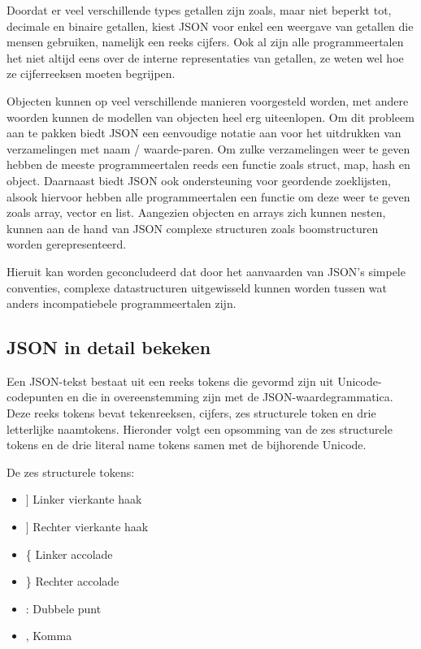 Doordat er veel verschillende types getallen zijn zoals, maar niet beperkt tot, decimale en binaire getallen, kiest JSON voor enkel een weergave van getallen die mensen gebruiken, namelijk een reeks cijfers. Ook al zijn alle programmeertalen het niet altijd eens over de interne representaties van getallen, ze weten wel hoe ze cijferreeksen moeten begrijpen.

 Objecten kunnen op veel verschillende manieren voorgesteld worden, met andere woorden kunnen de modellen van objecten heel erg uiteenlopen. Om dit probleem aan te pakken biedt JSON een eenvoudige notatie aan voor het uitdrukken van verzamelingen met naam / waarde-paren. Om zulke verzamelingen weer te geven hebben de meeste programmeertalen reeds een functie zoals struct, map, hash en object.
Daarnaast biedt JSON ook ondersteuning voor geordende zoeklijsten, alsook hiervoor hebben alle programmeertalen een functie om deze weer te geven zoals array, vector en list. Aangezien objecten en arrays zich kunnen nesten, kunnen aan de hand van JSON complexe structuren zoals boomstructuren worden gerepresenteerd.

Hieruit kan worden geconcludeerd dat door het aanvaarden van JSON's simpele conventies, complexe datastructuren uitgewisseld kunnen worden tussen wat anders incompatiebele programmeertalen zijn.



\subsection{JSON in detail bekeken}
\label{subsec:JSON in detail bekeken}

Een JSON-tekst bestaat uit een reeks tokens die gevormd zijn uit Unicode-codepunten en die in overeenstemming zijn met de JSON-waardegrammatica. Deze reeks tokens bevat tekenreeksen, cijfers, zes structurele token en drie letterlijke naamtokens.
Hieronder volgt een opsomming van de zes structurele tokens en de drie literal name tokens samen met de bijhorende Unicode.

De zes structurele tokens:

\begin{itemize}
    \item $\rbrack$ Linker vierkante haak
    \item $\rbrack$ Rechter vierkante haak
    \item \{ Linker accolade
    \item \} Rechter accolade
    \item : Dubbele punt
    \item , Komma
\end{itemize}

